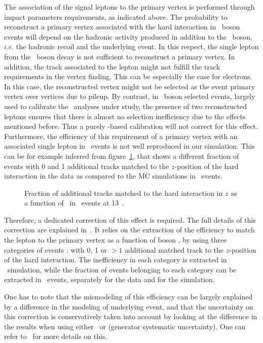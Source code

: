 The association of the signal leptons to the primary vertex is performed through impact parameters requirements, as indicated above.
The probability to reconstruct a primary vertex associated with the hard interaction in \Wboson\ boson events will depend on
the hadronic activity produced in addition to the \Wboson\ boson, $i.e.$ the hadronic recoil and the underlying event. In this respect, the single lepton from the
\Wboson\ boson decay is not sufficient to reconstruct a primary vertex. In addition, the track associated to the lepton might not
fulfill the track requirements in the vertex finding. This can be especially the case for electrons. In this case, the reconstructed
vertex might not be selected as the event primary vertex over vertices due to pileup.
By contrast, in \Zboson\ boson selected events, largely used to calibrate the \Wboson\ analyses under study, the presence of two reconstructed leptons ensures that there is almost no selection inefficiency due to the effects mentioned before.
Thus a purely \Zboson-based calibration will not correct for this effect. Furthermore,
the efficiency of this requirement of a primary vertex with an associated single lepton in
\Wboson\ events is not well reproduced in our simulation.
This can be for example inferred from figure~\ref{fig:n_Z}, that shows a different fraction of events with 0 and 1 additional tracks matched to the $z$-position of the hard interaction in the data as compared to the MC simulations in \Zmm\ events.
\begin{figure}[hb]
\begin{center}
\hspace*{10pt}
\caption{Fraction of additional tracks matched to the hard interaction in $z$ as a function of \ptmm\ in \Zmm\ events at 13~\TeV.\label{fig:n_Z}}
\end{center}
\end{figure}

Therefore, a dedicated correction of this effect is required.
The full details of this correction are explained in~\cite{Kretzschmar:2657141}.
It relies on the extraction of the efficiency to match the lepton to the primary vertex as a function of boson \pt, by using three categories of events : with 0, 1 or $>1$ additional matched track to the $z$-position of the hard interaction.
The inefficiency in each category is extracted in \Wboson\ simulation, while the fraction of events belonging to each category can be extracted in \Zboson\ events, separately for the data and for the simulation.

One has to note that the mismodeling of this efficiency can be largely explained by a difference in the modeling of underlying event, and that the
uncertainty on this correction is conservatively taken into account by looking at the difference in the results when using either \SHERPA\ or \POWPYTHIA (generator systematic uncertainty). One can refer to~\cite{Kretzschmar:2657141} for more details on this.
